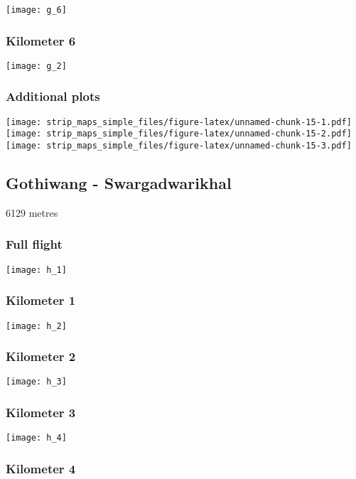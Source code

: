 \documentclass[]{article}
\begin{document}
\texttt{[image: g\_6]}

\subsubsection{Kilometer 6}\label{kilometer-6-6}

\texttt{[image: g\_2]}

\subsubsection{Additional plots}\label{additional-plots-6}

\texttt{[image: strip\_maps\_simple\_files/figure-latex/unnamed-chunk-15-1.pdf]}
\texttt{[image: strip\_maps\_simple\_files/figure-latex/unnamed-chunk-15-2.pdf]}
\texttt{[image: strip\_maps\_simple\_files/figure-latex/unnamed-chunk-15-3.pdf]}

\newpage

\subsection{Gothiwang -
Swargadwarikhal}\label{gothiwang---swargadwarikhal}

6129 metres

\subsubsection{Full flight}\label{full-flight-7}

\texttt{[image: h\_1]}

\subsubsection{Kilometer 1}\label{kilometer-1-7}

\texttt{[image: h\_2]}

\subsubsection{Kilometer 2}\label{kilometer-2-7}

\texttt{[image: h\_3]}

\subsubsection{Kilometer 3}\label{kilometer-3-7}

\texttt{[image: h\_4]}

\subsubsection{Kilometer 4}\label{kilometer-4-7}
\end{document}
